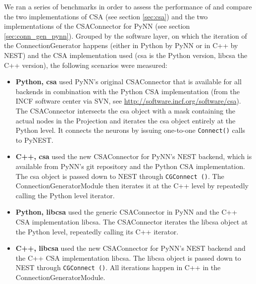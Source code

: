 \documentclass{frontiersSCNS} %
\begin{document}
We ran a series of benchmarks in order to assess the performance of
and compare the two implementations of CSA (see section \ref{sec:csa})
and the two implementations of the CSAConnector for PyNN (see section
\ref{sec:conn_gen_pynn}). Grouped by the software layer, on which the
iteration of the ConnectionGenerator happens (either in Python by PyNN
or in C++ by NEST) and the CSA implementation used (csa is the Python
version, libcsa the C++ version), the following scenarios were
measured:

\begin{itemize}
\item \textbf{Python, csa} used PyNN's original CSAConnector that is
  available for all backends in combination with the Python CSA
  implementation (from the INCF software center via SVN, see
  \url{http://software.incf.org/software/csa}). The CSAConnector
  intersects the csa object with a mask containing the actual nodes in
  the Projection and iterates the csa object entirely at the Python
  level. It connects the neurons by issuing one-to-one
  \verb|Connect()| calls to PyNEST.
\item \textbf{C++, csa} used the new CSAConnector for PyNN's NEST
  backend, which is available from PyNN's git repository and the
  Python CSA implementation. The csa object is passed down to NEST
  through \verb|CGConnect ()|. The ConnectionGeneratorModule then
  iterates it at the C++ level by repeatedly calling the Python level
  iterator.
\item \textbf{Python, libcsa} used the generic CSAConnector in PyNN
  and the C++ CSA implementation libcsa. The CSAConnector iterates the
  libcsa object at the Python level, repeatedly calling its C++
  iterator.
\item \textbf{C++, libcsa} used the new CSAConnector for PyNN's NEST
  backend and the C++ CSA implementation libcsa. The libcsa object is
  passed down to NEST through \verb|CGConnect ()|. All iterations
  happen in C++ in the ConnectionGeneratorModule.
\end{itemize}
\end{document}
